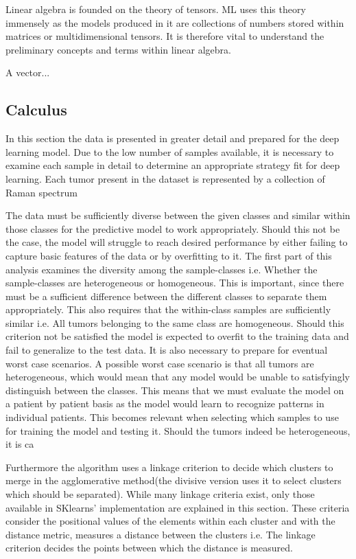 Linear algebra is founded on the theory of tensors. ML uses this theory immensely as the models produced in it are collections of numbers stored within matrices or multidimensional tensors. It is therefore vital to understand the preliminary concepts and terms within linear algebra.

A vector...

\subsection{Calculus}



In this section the data is presented in greater detail and prepared for the deep learning model. Due to the low number of samples available, it is necessary to examine each sample in detail to determine an appropriate strategy fit for deep learning. Each tumor present in the dataset is represented by a collection of Raman spectrum


The data must be sufficiently diverse between the given classes and similar within those classes for the predictive model to work appropriately. Should this not be the case, the model will struggle to reach desired performance by either failing to capture basic features of the data or by overfitting to it. The first part of this analysis examines the diversity among the sample-classes i.e. Whether the sample-classes are heterogeneous or homogeneous. This is important, since there must be a sufficient difference between the different classes to separate them appropriately. This also requires that the within-class samples are sufficiently similar i.e. All tumors belonging to the same class are homogeneous. Should this criterion not be satisfied the model is expected to overfit to the training data and fail to generalize to the test data. It is also necessary to prepare for eventual worst case scenarios. A possible worst case scenario is that all tumors are heterogeneous, which would mean that any model would be unable to satisfyingly distinguish between the classes. This means that we must evaluate the model on a patient by patient basis as the model would learn to recognize patterns in individual patients. This becomes relevant when selecting which samples to use for training the model and testing it. Should the tumors indeed be heterogeneous, it is ca  



Furthermore the algorithm uses a linkage criterion to decide which clusters to merge in the agglomerative method(the divisive version uses it to select clusters which should be separated). While many linkage criteria exist, only those available in SKlearns' implementation are explained in this section\cite{scikit}. These criteria consider the positional values of the elements within each cluster and with the distance metric, measures a distance between the clusters i.e. The linkage criterion decides the points between which the distance is measured.

